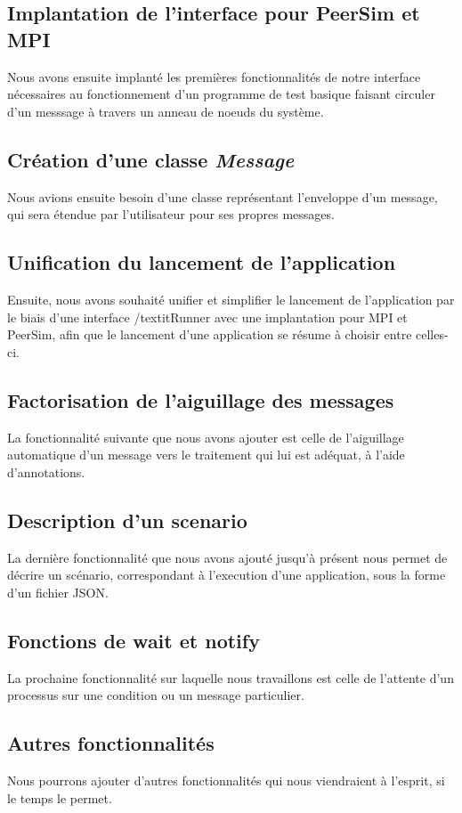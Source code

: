 \documentclass{article}
\begin{document}
			\subsection{Implantation de l'interface pour PeerSim et MPI}
				\large{ Nous avons ensuite implanté les premières fonctionnalités de notre interface nécessaires au fonctionnement d'un programme de test basique faisant circuler d'un messsage à travers un anneau de noeuds du système.}

			\subsection{Création d'une classe \textit{Message}}
				\large{Nous avions ensuite besoin d'une classe représentant l'enveloppe d'un message, qui sera étendue par l'utilisateur pour ses propres messages.}

	\newpage
			\subsection{Unification du lancement de l'application}
				\large{Ensuite, nous avons souhaité unifier et simplifier le lancement de l'application par le biais d'une interface /textit{Runner} avec une implantation pour MPI et PeerSim, afin que le lancement d'une application se résume à choisir entre celles-ci.}
			\subsection{Factorisation de l'aiguillage des messages}
				\large{La fonctionnalité suivante que nous avons ajouter est celle de l'aiguillage automatique d'un message vers le traitement qui lui est adéquat, à l'aide d'annotations.}
			\subsection{Description d'un scenario}
				\large{La dernière fonctionnalité que nous avons ajouté jusqu'à présent nous permet de décrire un scénario, correspondant à l'execution d'une application, sous la forme d'un fichier JSON.}
			\subsection{Fonctions de wait et notify}
				\large{La prochaine fonctionnalité sur laquelle nous travaillons est celle de l'attente d'un processus sur une condition ou un message particulier.}
			\subsection{Autres fonctionnalités}
				\large{Nous pourrons ajouter d'autres fonctionnalités qui nous viendraient à l'esprit, si le temps le permet.}
\end{document}

